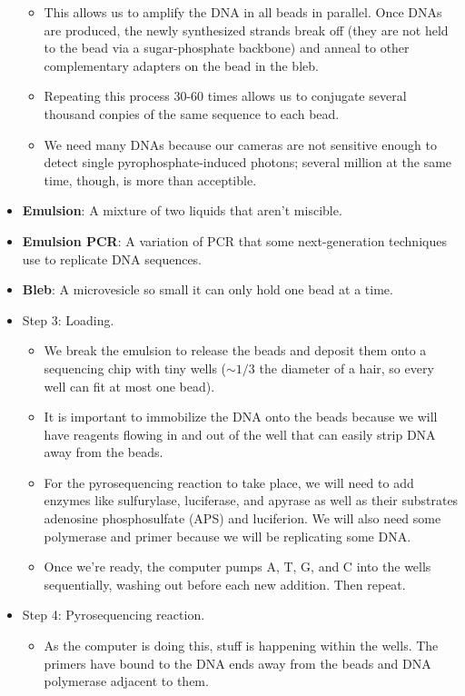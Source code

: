 \documentclass[../notes.tex]{subfiles}
\begin{document}
\begin{itemize}
\begin{itemize}
        \item This allows us to amplify the DNA in all beads in parallel. Once DNAs are produced, the newly synthesized strands break off (they are not held to the bead via a sugar-phosphate backbone) and anneal to other complementary adapters on the bead in the bleb.
        \item Repeating this process 30-60 times allows us to conjugate several thousand conpies of the same sequence to each bead.
        \item We need many DNAs because our cameras are not sensitive enough to detect single pyrophosphate-induced photons; several million at the same time, though, is more than acceptible.
    \end{itemize}
    \item \textbf{Emulsion}: A mixture of two liquids that aren't miscible.
    \item \textbf{Emulsion PCR}: A variation of PCR that some next-generation techniques use to replicate DNA sequences.
    \item \textbf{Bleb}: A microvesicle so small it can only hold one bead at a time.
    \item Step 3: Loading.
    \begin{itemize}
        \item We break the emulsion to release the beads and deposit them onto a sequencing chip with tiny wells ($\sim 1/3$ the diameter of a hair, so every well can fit at most one bead).
        \item It is important to immobilize the DNA onto the beads because we will have reagents flowing in and out of the well that can easily strip DNA away from the beads.
        \item For the pyrosequencing reaction to take place, we will need to add enzymes like sulfurylase, luciferase, and apyrase as well as their substrates adenosine phosphosulfate (APS) and luciferion. We will also need some polymerase and primer because we will be replicating some DNA.
        \item Once we're ready, the computer pumps A, T, G, and C into the wells sequentially, washing out before each new addition. Then repeat.
    \end{itemize}
    \item Step 4: Pyrosequencing reaction.
    \begin{itemize}
        \item As the computer is doing this, stuff is happening within the wells. The primers have bound to the DNA ends away from the beads and DNA polymerase adjacent to them.

\end{itemize}
\end{itemize}
\end{document}
